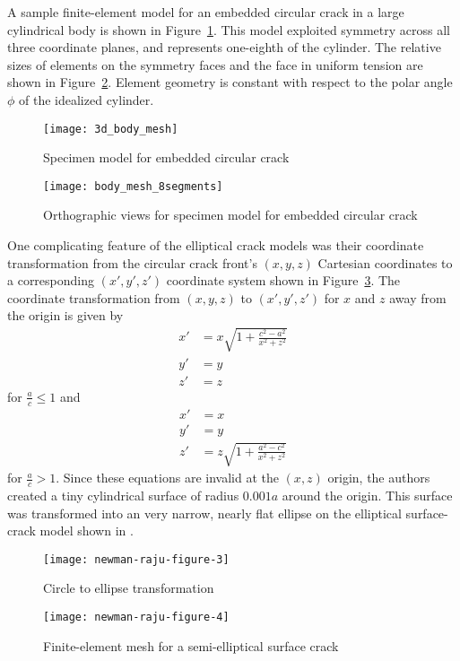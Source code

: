 A sample finite-element model for an embedded circular crack in a large cylindrical body is shown in Figure~\ref{fig:specimen_model}. This model exploited symmetry across all three coordinate planes, and represents one-eighth of the cylinder. The relative sizes of elements on the symmetry faces and the face in uniform tension are shown in Figure~\ref{fig:body_mesh_orthographic}. Element geometry is constant with respect to the polar angle $\phi$ of the idealized cylinder.
\begin{figure}[tbp]
\centering
   \texttt{[image: 3d\_body\_mesh]}
   \caption{Specimen model for embedded circular crack}
   \label{fig:specimen_model}
\end{figure}
\begin{figure}[tbp]
\centering
	   \texttt{[image: body\_mesh\_8segments]}
      \caption{Orthographic views for specimen model for embedded circular crack}
      \label{fig:body_mesh_orthographic}
\end{figure}

One complicating feature of the elliptical crack models was their coordinate transformation from the circular crack front's $(x,y,z)$ Cartesian coordinates to a corresponding $(x',y',z')$ coordinate system shown in Figure~\ref{fig:circle_to_ellipse}. The coordinate transformation from $(x,y,z)$ to $(x',y',z')$ for $x$ and $z$ away from the origin is given by
\begin{align}
  x' &= x \sqrt{1+\frac{c^2-a^2}{x^2+z^2}} \\
  y' &= y \\
  z' &= z
\end{align}
for $\frac{a}{c} \leq 1$ and
\begin{align}
  x' &= x \\
  y' &= y \\
  z' &= z \sqrt{1+\frac{a^2-c^2}{x^2+z^2}}
\end{align}
for $\frac{a}{c} > 1$. Since these equations are invalid at the $(x,z)$ origin, the authors created a tiny cylindrical surface of radius $0.001 a$ around the origin. This surface was transformed into an very narrow, nearly flat ellipse on the elliptical surface-crack model shown in .
\begin{figure}[tbp]
\centering
	   \texttt{[image: newman-raju-figure-3]}
      \caption[Circle to ellipse transformation]{Circle to ellipse transformation \citep{rajunewman1979}}
      \label{fig:circle_to_ellipse}
\end{figure}
\begin{figure}[tbp]
\centering
	   \texttt{[image: newman-raju-figure-4]}
      \caption[Finite-element mesh for a semi-ellip\-tical surface crack]{Finite-element mesh for a semi-ellip\-tical surface crack \citep{rajunewman1979}}
      \label{fig:elliptical_model}
\end{figure}

